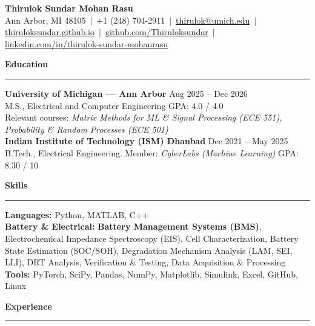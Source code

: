 \documentclass[9pt]{article}
\newcommand{\sect}[1]{\vspace{4pt}\noindent\textbf{\large #1}\vspace{3pt}\hrule\vspace{6pt}}
\begin{document}
\begin{center}
  {\Large \textbf{Thirulok Sundar Mohan Rasu}}\\[3pt]
  Ann Arbor, MI 48105 $\,|\,$ +1 (248) 704-2911 $\,|\,$
  \href{mailto:thirulok@umich.edu}{thirulok@umich.edu} $\,|\,$
  \href{https://thiruloksundar.github.io}{thiruloksundar.github.io} $\,|\,$
  \href{https://github.com/Thiruloksundar}{github.com/Thiruloksundar} $\,|\,$
  \href{https://www.linkedin.com/in/thirulok-sundar-mohanrasu/}{linkedin.com/in/thirulok-sundar-mohanrasu}
\end{center}
\vspace{-3mm}

\sect{Education}
\textbf{University of Michigan --- Ann Arbor} \hfill Aug 2025 -- Dec 2026\\
M.S., Electrical and Computer Engineering \hfill GPA: 4.0 / 4.0\\
Relevant courses: \emph{Matrix Methods for ML \& Signal Processing (ECE 551), Probability \& Random Processes (ECE 501)}\\[5pt]
\textbf{Indian Institute of Technology (ISM) Dhanbad} \hfill Dec 2021 -- May 2025\\
B.Tech., Electrical Engineering. Member: \emph{CyberLabs (Machine Learning)} \hfill GPA: 8.30 / 10

\sect{Skills}
\textbf{Languages:} Python, MATLAB, C++\\
\textbf{Battery \& Electrical:} \textbf{Battery Management Systems (BMS)}, Electrochemical Impedance Spectroscopy (EIS), Cell Characterization, Battery State Estimation (SOC/SOH), Degradation Mechanism Analysis (LAM, SEI, LLI), DRT Analysis, Verification \& Testing, Data Acquisition \& Processing\\
\textbf{Tools:} PyTorch, SciPy, Pandas, NumPy, Matplotlib, Simulink, Excel, GitHub, Linux

\sect{Experience}
\end{document}
